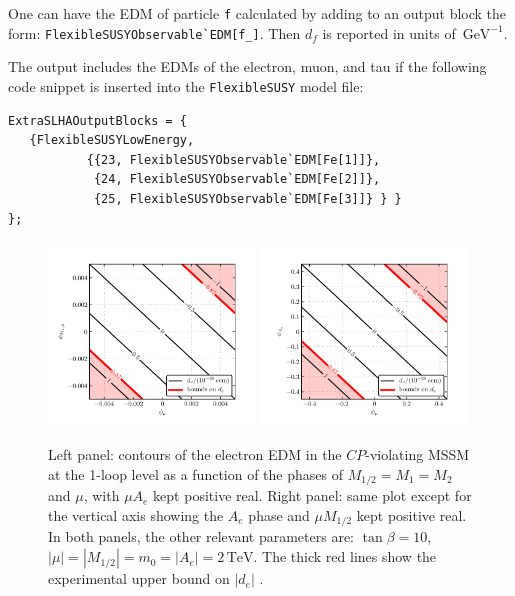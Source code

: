 \documentclass[final,3p,11pt,pdflatex]{elsarticle}
\makeatletter
\newcommand{\fs}{\texttt{FlexibleSUSY}\@\xspace}
\newcommand{\code}[1]{\lstinline|#1|}  %
\newcommand{\unit}[1]{\,\text{#1}}      %
\newcommand{\edm}[1]{\ensuremath{d_{#1}}\xspace}
\newcommand{\CP}{\ensuremath{CP}\xspace}
\newcommand{\mhalf}{\ensuremath{M_{1/2}}\xspace}
\newcommand{\mzero}{\ensuremath{m_0}\xspace}
\makeatother
\begin{document}
One can have the EDM of particle \code{f} calculated
by adding to an output block the form: \code{FlexibleSUSYObservable`EDM[f_]}.
Then $\edm{f}$ is reported in units of $\unit{GeV}^{-1}$.
\begin{example}
The output includes
the EDMs of the electron, muon, and tau if
the following code snippet is inserted into the \fs model file:
\begin{lstlisting}
ExtraSLHAOutputBlocks = {
   {FlexibleSUSYLowEnergy,
           {{23, FlexibleSUSYObservable`EDM[Fe[1]]},
            {24, FlexibleSUSYObservable`EDM[Fe[2]]},
            {25, FlexibleSUSYObservable`EDM[Fe[3]]} } }
};
\end{lstlisting}
\end{example}

\begin{figure}
  \centering
  \includegraphics[width=0.49\textwidth]{doc/manuals/plots/MSSMCPV/contour_de_PhiMuM12}\hfill
  \includegraphics[width=0.49\textwidth]{doc/manuals/plots/MSSMCPV/contour_de_PhiMuTe}
  \caption{Left panel: contours of the electron EDM in the
    \CP-violating MSSM at the 1-loop level as a function of
    the phases of $\mhalf = M_1 = M_2$ and $\mu$,
    with $\mu A_e$ kept positive real.
    Right panel: same plot except for the vertical axis showing
    the $A_e$ phase and $\mu \mhalf$ kept positive real.
    In both panels, the other relevant parameters are:
    $\tan\beta = 10$, $|\mu| = |\mhalf| = \mzero = |A_e| = 2\unit{TeV}$.
    The thick red lines show the experimental upper bound on $|\edm{e}|$
    \cite{Baron:2013eja}.}
  \label{fig:EDM plots}
\end{figure}
\end{document}
